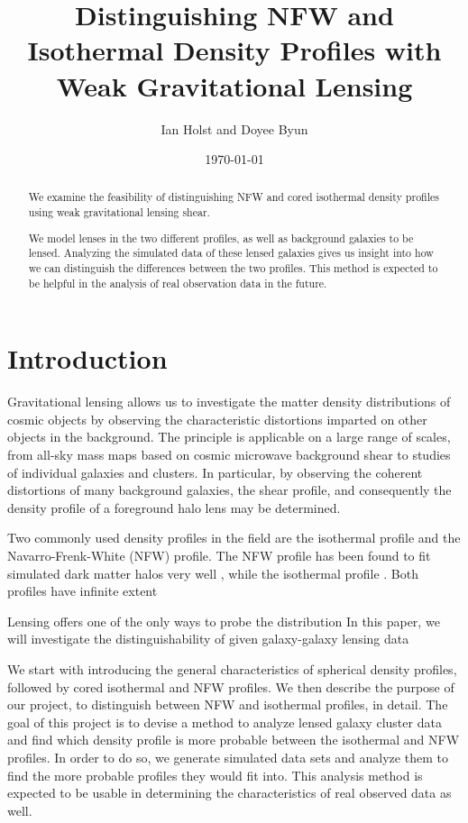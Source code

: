 \documentclass[10pt]{article}
\begin{document}
\title{Distinguishing NFW and Isothermal Density Profiles with Weak Gravitational Lensing}
\author{Ian Holst and Doyee Byun}
\date{\today}
\maketitle

\begin{abstract}
We examine the feasibility of distinguishing NFW and cored isothermal density profiles using weak gravitational lensing shear.

We model lenses in the two different profiles, as well as background galaxies to be lensed.
Analyzing the simulated data of these lensed galaxies gives us insight into how we can distinguish the differences between the two profiles.
This method is expected to be helpful in the analysis of real observation data in the future.
\end{abstract}


\section{Introduction}
Gravitational lensing allows us to investigate the matter density distributions of cosmic objects by observing the characteristic distortions imparted on other objects in the background. The principle is applicable on a large range of scales, from all-sky mass maps based on cosmic microwave background shear to studies of individual galaxies and clusters. In particular, by observing the coherent distortions of many background galaxies, the shear profile, and consequently the density profile of a foreground halo lens may be determined.

Two commonly used density profiles in the field are the isothermal profile and the Navarro-Frenk-White (NFW) profile. The NFW profile has been found to fit simulated dark matter halos very well \citep{}, while the isothermal profile .
Both profiles have infinite extent

Lensing offers one of the only ways to probe the distribution
In this paper, we will investigate the distinguishability of
given galaxy-galaxy lensing data

We start with introducing the general characteristics of spherical density profiles, followed by cored isothermal and NFW profiles.
We then describe the purpose of our project, to distinguish between NFW and isothermal profiles, in detail.
The goal of this project is to devise a method to analyze lensed galaxy cluster data and find which density profile is more probable between the isothermal and NFW profiles.
In order to do so, we generate simulated data sets and analyze them to find the more probable profiles they would fit into.
This analysis method is expected to be usable in determining the characteristics of real observed data as well.
\end{document}
